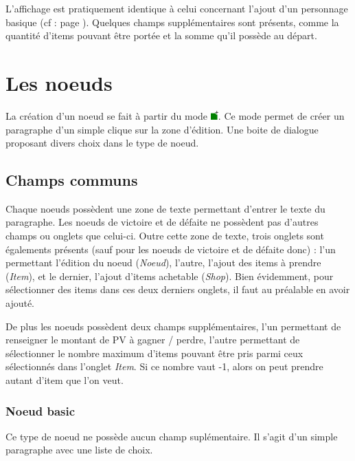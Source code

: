 			L'affichage est pratiquement identique à celui concernant l'ajout d'un personnage basique (cf :  page \pageref{sec:perso}). Quelques champs supplémentaires sont présents, comme la quantité d'items pouvant être portée et la somme qu'il possède au départ.

	\section{Les noeuds}

		\label{sec:noeuds}
		La création d'un noeud se fait à partir du mode \includegraphics[height=10pt, keepaspectratio]{img/icons/add_node.png}. Ce mode permet de créer un paragraphe d'un simple clique sur la zone d'édition. Une boite de dialogue proposant divers choix dans le type de noeud.

		\subsection{Champs communs}

			Chaque noeuds possèdent une zone de texte permettant d'entrer le texte du paragraphe. Les noeuds de victoire et de défaite ne possèdent pas d'autres champs ou onglets que celui-ci. Outre cette zone de texte, trois onglets sont égalements présents (sauf pour les noeuds de victoire et de défaite donc) : l'un permettant l'édition du noeud (\textit{Noeud}), l'autre, l'ajout des items à prendre (\textit{Item}), et le dernier, l'ajout d'items achetable (\textit{Shop}). Bien évidemment, pour sélectionner des items dans ces deux derniers onglets, il faut au préalable en avoir ajouté.

			De plus les noeuds possèdent deux champs supplémentaires, l'un permettant de renseigner le montant de PV à gagner / perdre, l'autre permettant de sélectionner le nombre maximum d'items pouvant être pris parmi ceux sélectionnés dans l'onglet \textit{Item}. Si ce nombre vaut -1, alors on peut prendre autant d'item que l'on veut.

			\subsubsection{Noeud basic}

				Ce type de noeud ne possède aucun champ suplémentaire. Il s'agit d'un simple paragraphe avec une liste de choix.

